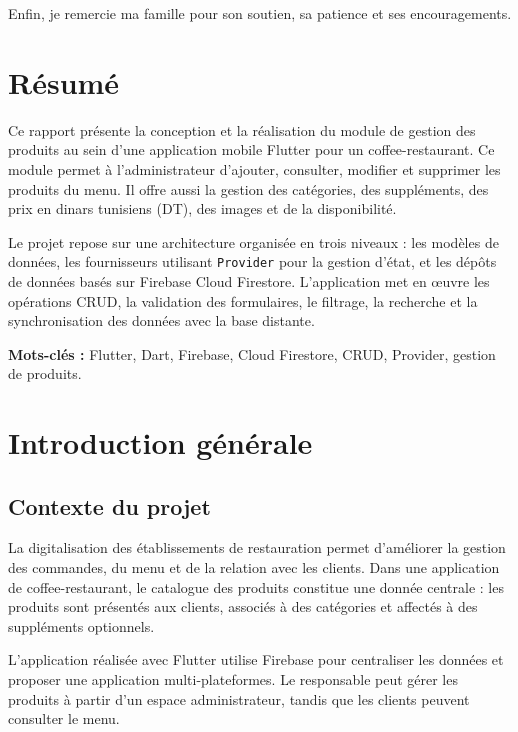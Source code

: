 \documentclass[12pt,a4paper]{report}
\begin{document}
Enfin, je remercie ma famille pour son soutien, sa patience et ses encouragements.

\chapter*{Résumé}

Ce rapport présente la conception et la réalisation du module de gestion des produits
au sein d'une application mobile Flutter pour un coffee-restaurant. Ce module permet
à l'administrateur d'ajouter, consulter, modifier et supprimer les produits du menu.
Il offre aussi la gestion des catégories, des suppléments, des prix en dinars tunisiens
(DT), des images et de la disponibilité.

Le projet repose sur une architecture organisée en trois niveaux : les modèles
de données, les fournisseurs utilisant \texttt{Provider} pour la gestion d'état,
et les dépôts de données basés sur Firebase Cloud Firestore. L'application met en œuvre
les opérations CRUD, la validation des formulaires, le filtrage, la recherche et
la synchronisation des données avec la base distante.

\textbf{Mots-clés :} Flutter, Dart, Firebase, Cloud Firestore, CRUD, Provider,
gestion de produits.

\tableofcontents
\listoffigures
\listoftables

\chapter{Introduction générale}

\section{Contexte du projet}

La digitalisation des établissements de restauration permet d'améliorer la gestion
des commandes, du menu et de la relation avec les clients. Dans une application de
coffee-restaurant, le catalogue des produits constitue une donnée centrale : les
produits sont présentés aux clients, associés à des catégories et affectés à des
suppléments optionnels.

L'application réalisée avec Flutter utilise Firebase pour centraliser les données
et proposer une application multi-plateformes. Le responsable peut gérer les produits
à partir d'un espace administrateur, tandis que les clients peuvent consulter le menu.
\end{document}
